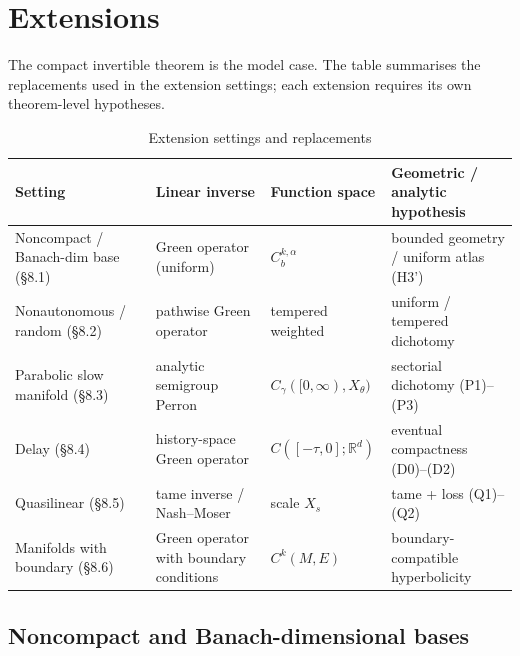 \documentclass[11pt,a4paper]{article}
\theoremstyle{plain}
\theoremstyle{definition}
\theoremstyle{remark}
\numberwithin{equation}{section}
\numberwithin{figure}{section}
\begin{document}
\section{Extensions}

The compact invertible theorem is the model case. The table summarises the replacements used in the extension settings; each extension requires its own theorem-level hypotheses.

\begin{table}[h]
\centering
\begin{tabular}{l|l|l|l}
\toprule
Setting & Linear inverse & Function space & Geometric / analytic hypothesis\\
\midrule
Noncompact / Banach-dim base (§8.1) & Green operator (uniform) & $C^{k,\alpha}_b$ & bounded geometry / uniform atlas (H3') \\
Nonautonomous / random (§8.2) & pathwise Green operator & tempered weighted & uniform / tempered dichotomy \\
Parabolic slow manifold (§8.3) & analytic semigroup Perron & $C_\gamma([0,\infty),X_\theta)$ & sectorial dichotomy (P1)–(P3) \\
Delay (§8.4) & history-space Green operator & $C([-\tau,0];\mathbb R^d)$ & eventual compactness (D0)–(D2) \\
Quasilinear (§8.5) & tame inverse / Nash–Moser & scale $X_s$ & tame + loss (Q1)–(Q2) \\
Manifolds with boundary (§8.6) & Green operator with boundary conditions & $C^k(M,E)$ & boundary-compatible hyperbolicity \\
\bottomrule
\end{tabular}
\caption{Extension settings and replacements}
\label{tab:extensions}
\end{table}


\subsection{Noncompact and Banach-dimensional bases}
\end{document}
